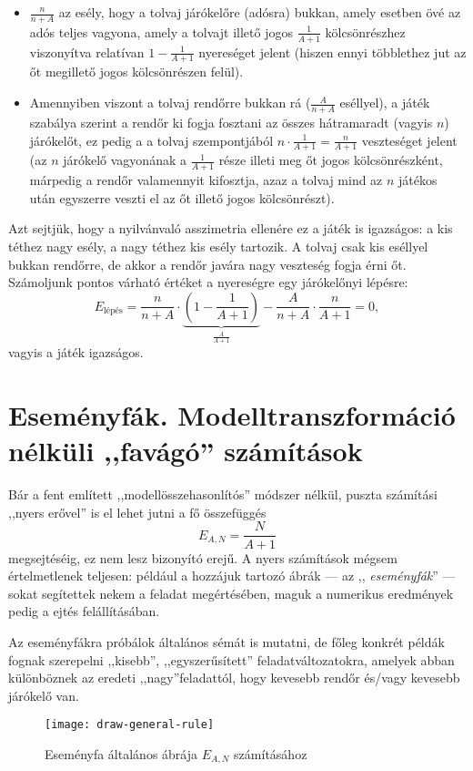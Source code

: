 \documentclass{article}
\newcommand{\parenthesed}[1]{\left(#1\right)}
\begin{document}
	\begin{itemize}	
		\item $\frac{n}{n+A}$ az esély, hogy a tolvaj járókelőre (adósra) bukkan, amely esetben övé az adós teljes vagyona, amely a tolvajt illető jogos $\frac1{A+1}$ kölcsönrészhez viszonyítva relatívan  $1-\frac1{A+1}$ nyereséget jelent (hiszen ennyi többlethez jut az őt megillető jogos kölcsönrészen felül).
		\item Amennyiben viszont a tolvaj rendőrre bukkan rá ($\frac A{n+A}$ eséllyel), a játék szabálya szerint a rendőr ki fogja fosztani az összes hátramaradt (vagyis $n$) járókelőt, ez pedig a a tolvaj szempontjából $n\cdot\frac1{A+1} = \frac n{A+1}$ veszteséget jelent (az $n$ járókelő vagyonának a $\frac1{A+1}$ része illeti meg őt jogos kölcsönrészként, márpedig a rendőr valamennyit kifosztja, azaz a tolvaj mind az $n$ játékos után egyszerre veszti el az őt illető jogos kölcsönrészt).
	\end{itemize}
	Azt sejtjük, hogy a nyilvánvaló asszimetria ellenére ez a játék is igazságos: a kis téthez nagy esély, a nagy téthez kis esély tartozik. A tolvaj csak kis eséllyel bukkan rendőrre, de akkor a rendőr javára nagy veszteség fogja érni őt.
	Számoljunk pontos várható értéket a nyereségre egy járókelőnyi lépésre:
	\[E_{\text{lépés}} = \frac{n}{n+A}\cdot\underbrace{\parenthesed{1-\frac1{A+1}}}_{\frac A{A+1}} - \frac A{n+A}\cdot\frac n{A+1} = 0,\]
	vagyis a játék igazságos.	


	\section{Eseményfák. Modelltranszformáció nélküli ,,favágó'' számítások}

	Bár a fent említett ,,modellösszehasonlítós'' módszer nélkül, puszta számítási ,,nyers erővel'' is el lehet jutni a fő összefüggés
	\[
		E_{A,N} = \frac N{A+1}
	\]
	megsejtéséig, ez nem lesz bizonyító erejű. A nyers számítások mégsem értelmetlenek teljesen:
	például a hozzájuk tartozó ábrák --- az ,, \emph{eseményfák}'' --- sokat segítettek nekem a feladat megértésében,
	maguk a numerikus eredmények pedig a ejtés felállításában.

	Az eseményfákra próbálok általános sémát is mutatni, de főleg konkrét példák fognak szerepelni ,,kisebb'', ,,egyszerűsített'' feladatváltozatokra,
	amelyek abban különböznek az eredeti ,,nagy''feladattól, hogy kevesebb rendőr és/vagy  kevesebb járókelő van.

	\begin{figure}[H]
		\caption*{Eseményfa általános ábrája $E_{A,N}$ számításához}
		\centering
		\texttt{[image: draw-general-rule]}
	\end{figure}
\end{document}
